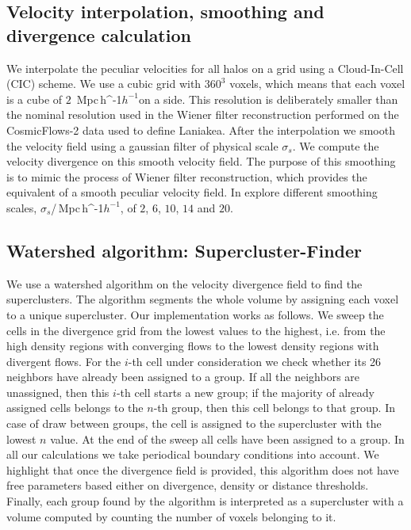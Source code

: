 \documentclass[usenatbib]{mnras}
\newcommand{\Mpch}{\,{\rm Mpc}\,\ifmmode h^{-1}\else $h^{-1}$\fi}
\begin{document}
\subsection{Velocity interpolation, smoothing and divergence calculation}  

We interpolate the peculiar velocities for all halos on a grid using a
Cloud-In-Cell (CIC) scheme. 
We use a cubic grid with $360^3$ voxels, which means that each voxel
is a cube of $2$ \Mpch on a side.  
This resolution is deliberately smaller than the nominal resolution
used in the Wiener filter reconstruction performed on the
CosmicFlows-2 data used to define Laniakea. 
After the interpolation we smooth the velocity field using a gaussian
filter of physical scale $\sigma_s$.  
We compute the velocity divergence on this smooth velocity field. 
The purpose of this smoothing is to mimic the process of Wiener filter
reconstruction, which provides the equivalent of a smooth peculiar
velocity field. 
In explore different smoothing scales, $\sigma_s$/\Mpch, of $2$, $6$,
$10$, $14$ and $20$. 





\subsection{Watershed algorithm: Supercluster-Finder}

We use a watershed algorithm \citep{BeucherWatershed1979} on the velocity divergence field to find the
superclusters.
The algorithm segments the whole volume by assigning each voxel to a unique supercluster. 
Our implementation works as follows. 
We sweep the cells in the divergence grid from the lowest values to the highest, i.e. from
the high density regions with converging flows to the lowest density regions with divergent
flows.
For the $i$-th cell under consideration we check whether its 26 neighbors have already been assigned to a group. 
If all the neighbors are unassigned, then this $i$-th cell starts a
new group; if the majority of already assigned cells belongs to the
$n$-th group, then this cell belongs to that group.
In case of draw between groups, the cell is assigned to the supercluster with the lowest $n$ value.
At the end of the sweep all cells have been assigned to a group. 
In all our calculations we take periodical boundary conditions into
account.  
We highlight that once the divergence field is provided, this algorithm
does not have free parameters based either on divergence, density or distance thresholds. 
Finally, each group found by the algorithm is interpreted as a supercluster 
with a volume computed by counting the number of voxels belonging to it.
\end{document}
